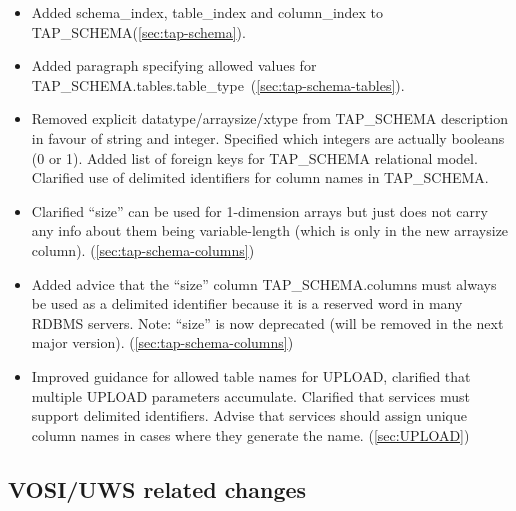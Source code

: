 \documentclass[11pt,letter]{ivoa}
\newcommand{\tapschema}{TAP\_SCHE\-MA}
\newcommand{\tapschema}{\mbox{%
  \relsize{-0.5}TAP\discretionary{-}{}{\kern-2pt\_}SCHEMA}}
\begin{document}
\begin{itemize}
\item Added schema\_index, table\_index and column\_index to \tapschema (\ref{sec:tap-schema}).


\item Added paragraph specifying allowed values for \tapschema.tables.table\_type\ (\ref{sec:tap-schema-tables}).

\item Removed explicit datatype/arraysize/xtype from \tapschema{} description
in favour of string and integer. Specified which integers are actually
booleans (0 or 1). Added list of foreign keys for \tapschema{}
relational model. Clarified use of delimited identifiers for column names in 
\tapschema. 

\item Clarified ``size'' can be used for 1-dimension arrays but just does not carry any info about them being variable-length (which is only in the new arraysize column).
(\ref{sec:tap-schema-columns})

\item Added advice that the ``size'' column \tapschema.columns must always be used 
as a delimited identifier because it is a reserved word in many RDBMS 
servers. Note: ``size'' is now deprecated (will be removed in the next major version).
(\ref{sec:tap-schema-columns})

\item Improved guidance for allowed table names for UPLOAD, clarified that 
multiple UPLOAD parameters accumulate. Clarified that services 
must support delimited identifiers. Advise that services should assign unique 
column names in cases where they generate the name.
(\ref{sec:UPLOAD})

\end{itemize}

\subsection{VOSI/UWS related changes}
\end{document}
